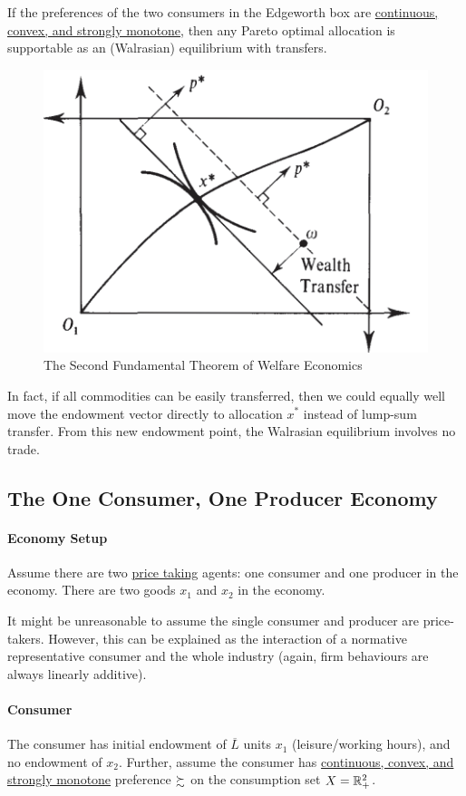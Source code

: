 \documentclass{report}
\begin{document}
		\begin{proposition}
			If the preferences of the two consumers in the Edgeworth box are \ul{continuous, convex, and strongly monotone}, then any Pareto optimal allocation is supportable as an (Walrasian) equilibrium with transfers.
		\end{proposition}
		
		\begin{figure}[h]
			\centering
			\includegraphics[width=0.4\linewidth]{figures/2ndFTWE.png}
			\caption{The Second Fundamental Theorem of Welfare Economics}
		\end{figure}
		
		\begin{remark}
			In fact, if all commodities can be easily transferred, then we could equally well move the endowment vector directly to allocation $x^*$ instead of lump-sum transfer. From this new endowment point, the Walrasian equilibrium involves no trade.
		\end{remark}
		
		\newpage
		\subsection{The One Consumer, One Producer Economy}
			\paragraph{Economy Setup} Assume there are two \ul{price taking} agents: one consumer and one producer in the economy. There are two goods $x_1$ and $x_2$ in the economy.
			
			\begin{remark}
				It might be unreasonable to assume the single consumer and producer are price-takers. However, this can be explained as the interaction of a normative representative consumer and the whole industry (again, firm behaviours are always linearly additive).
			\end{remark}
			
			\paragraph{Consumer} The consumer has initial endowment of $\overline{L}$ units $x_1$ (leisure/working hours), and no endowment of $x_2$. Further, assume the consumer has \ul{continuous, convex, and strongly monotone} preference $\succsim$ on the consumption set $X=\mathbb{R}^2_+$.
\end{document}
